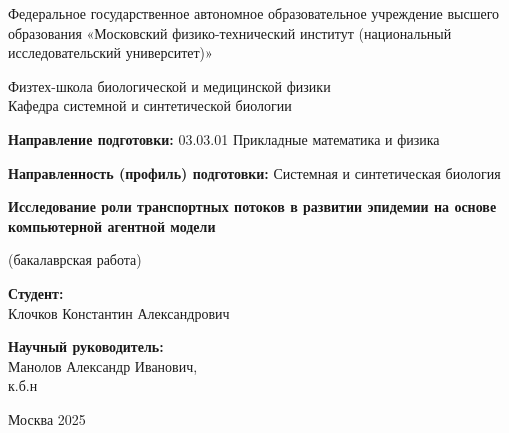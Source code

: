 \documentclass[a4paper,12pt]{article} %
\begin{document}
\begin{titlepage}

\begin{center}
    {\large Федеральное государственное автономное 
образовательное учреждение высшего образования 
«Московский физико-технический институт 
(национальный исследовательский университет)»}
\end{center}
\begin{center}
    {\large Физтех-школа биологической и медицинской физики \\ Кафедра системной и синтетической биологии}
\end{center}
\noindent \textbf{Направление подготовки:} 03.03.01 Прикладные математика и физика

\noindent \textbf{Направленность (профиль) подготовки:} Системная и синтетическая биология

    \vspace{3.5cm}


\vspace{0.1cm}
{\huge
\begin{center}
    \textbf{Исследование роли транспортных потоков в развитии эпидемии на основе компьютерной агентной модели}
   \\
\end{center}
}
{\large
\begin{center}
    (бакалаврская работа)
   \\
\end{center}
}
\vspace{3.5cm}

\begin{flushright}
\large \textbf{Студент:} \\Клочков Константин Александрович
\vspace{0.2cm}
\end{flushright}

\begin{flushright}
\large \textbf{Научный руководитель:} \\ Манолов Александр Иванович, \\ к.б.н
\vspace{0.2cm}
\end{flushright}

\vspace{2.5cm}

\begin{center}
    Москва 2025
\end{center}

\end{titlepage}
\end{document}
